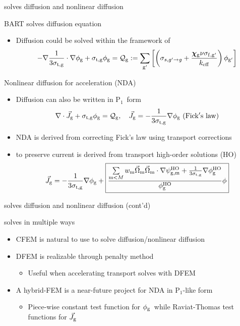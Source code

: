 \begin{frame}{ solves diffusion and nonlinear diffusion}
	\begin{block}{BART solves diffusion equation}
		\begin{itemize}
			\item Diffusion could be solved within the framework of 
			\begin{equation}
				-\nabla\frac{1}{3\sigma_\mathrm{t,g}}\cdot\nabla\phi_\mathrm{g}+\sigma_\mathrm{t,g}\phi_\mathrm{g}=\mathcal{Q}_{\mathrm{{g}}}:=\sum\limits_{\mathrm{{g'}}}\left[\left(\sigma_{s,g'\to g}+\frac{{\bm \chi}_\mathrm{g}\nu\sigma_{\mathrm{{f,g'}}}}{k_{\mathrm{{eff}}}}\right)\phi_{\mathrm{g}'}\right]
			\end{equation}
		\end{itemize}
	\end{block}

	\begin{block}{Nonlinear diffusion for acceleration (NDA)}
		\begin{itemize}
			\item Diffusion can also be written in P$_1$\ form
			\begin{equation}
			\nabla\cdot\vec{J}_\mm{g}+\sigtg\phig=\mq_\mm{g},\quad\vec{J}_\mm{g}=-\frac{1}{3\sigtg}\nabla\phi_\mm{g}\ (\mm{Fick's\ law})
			\end{equation}
			\item NDA is derived from correcting Fick's law using transport corrections
			\item {} to preserve current is derived from transport high-order solutions (HO)
			\begin{equation}
				\vec{J}_{\mathrm{{g}}}=-\frac{1}{3\sigma_\mathrm{t,g}}\nabla\phi_{\mathrm{{g}}}+\boxed{\frac{\sum\limits_{\mathrm{{m}}<M}w_{\mathrm{{m}}}\vec{\Omega}_{\mathrm{{m}}}\vec{\Omega}_{\mathrm{{m}}}\cdot\nabla\psi_{\mathrm{{g,m}}}^{\mathrm{{HO}}}+\frac{1}{3\sigma_\mathrm{t,g}}\nabla\phi_{\mathrm{{g}}}^{\mathrm{{HO}}}}{\phi_{\mathrm{{g}}}^{\mathrm{{HO}}}}\phi}
			\end{equation}
		\end{itemize}
	\end{block}
\end{frame}

\begin{frame}{ solves diffusion and nonlinear diffusion (cont'd)}
	\begin{block}{ solves in multiple ways}
		\begin{itemize}
			\item CFEM is natural to use to solve diffusion/nonlinear diffusion
			\item DFEM is realizable through penalty method
			\begin{itemize}
				\item Useful when accelerating transport solves with DFEM
			\end{itemize}
			\item A hybrid-FEM is a near-future project for NDA in P$_1$-like form
			\begin{itemize}
				\item Piece-wise constant test function for $\phi_\mathrm{g}$\ while Raviat-Thomas test functions for $\vec{J}_{\mathrm{{g}}}$
			\end{itemize}
		\end{itemize}
	\end{block}
\end{frame}